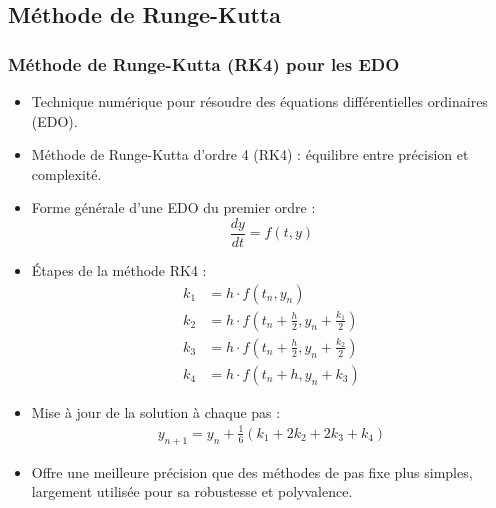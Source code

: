 \documentclass[10pt]{beamer}
\begin{document}
\subsection{Méthode de Runge-Kutta}
\begin{frame}
    \frametitle{Méthode de Runge-Kutta (RK4) pour les EDO}
    \small
    \begin{itemize}
        \item Technique numérique pour résoudre des équations différentielles ordinaires (EDO).
        
        \item Méthode de Runge-Kutta d'ordre 4 (RK4) : équilibre entre précision et complexité.
        
        \item Forme générale d'une EDO du premier ordre :
            \[
            \frac{dy}{dt} = f(t, y)
            \]
        
        \item Étapes de la méthode RK4 :
            \begin{align*}
            k_1 &= h \cdot f(t_n, y_n) \\
            k_2 &= h \cdot f(t_n + \frac{h}{2}, y_n + \frac{k_1}{2}) \\
            k_3 &= h \cdot f(t_n + \frac{h}{2}, y_n + \frac{k_2}{2}) \\
            k_4 &= h \cdot f(t_n + h, y_n + k_3)
            \end{align*}
        
        \item Mise à jour de la solution à chaque pas :
            \begin{align*}
             y_{n+1} = y_n + \frac{1}{6}(k_1 + 2k_2 + 2k_3 + k_4)
            \end{align*}
        
        \item Offre une meilleure précision que des méthodes de pas fixe plus simples, largement utilisée pour sa robustesse et polyvalence.
    \end{itemize}
\end{frame}
\end{document}
